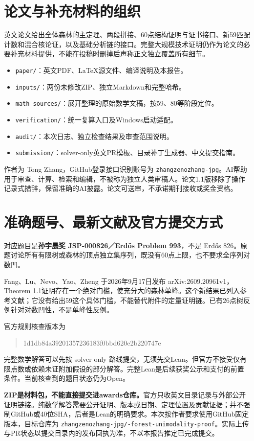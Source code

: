 \documentclass[UTF8,10pt,a4paper]{ctexart}
\begin{document}
\section{论文与补充材料的组织}
英文论文给出全体森林的主定理、两段拼接、60点结构证明与证书接口、新59匹配计数和混合核论证，以及基础分析链的接口。完整大规模技术证明仍作为论文的必要补充材料提供，不能在投稿时删掉后声称正文独立覆盖所有细节。

\begin{itemize}
\item \texttt{paper/}：英文PDF、LaTeX源文件、编译说明及本报告。
\item \texttt{inputs/}：两份未修改ZIP、独立Markdown和完整哈希。
\item \texttt{math-sources/}：展开整理的原始数学文稿，按59、80等阶段定位。
\item \texttt{verification/}：统一复算入口及Windows启动适配。
\item \texttt{audit/}：本次日志、独立检查结果及审查范围说明。
\item \texttt{submission/}：solver-only英文PR模板、目录补丁生成器、中文提交指南。
\end{itemize}
作者为 Tong Zhang，GitHub登录接口识别账号为 \texttt{zhangzenozhang-jpg}。AI帮助用于审查、计算、检索和编辑，不被称为独立人类审稿人。论文1.1版移除了操作记录式措辞，保留准确的AI披露。论文可送审，不承诺期刊接收或奖金资格。

\section{准确题号、最新文献及官方提交方式}
对应题目是\textbf{孙宇晨奖 JSP-000826／Erd\H{o}s Problem 993}，不是 Erd\H{o}s 826。原题讨论所有有限树或森林的顶点独立集序列，既没有60点上限，也不要求全序列对数凹。

Fang、Lu、Nevo、Yao、Zheng 于2026年9月17日发布 arXiv:2609.20961v1，Theorem 1.1证明存在一个绝对门槛，使充分大的森林单峰。这个新结果已列入参考文献；它没有给出59这个具体门槛，不能替代附件的定量证明链。已有26点树反例针对对数凹性，不是单峰性反例。

官方规则核查版本为
\begin{quote}\small\ttfamily
1d1db84a39201357236183f0bbd620e2b220747e
\end{quote}
完整数学解答可以先按 solver-only 路线提交，无须先交Lean。但官方不接受仅有限点数或依赖未证附加假设的部分解答。完整Lean是后续获奖公示和支付的前置条件。当前核查到的题目状态仍为Open。

\textbf{ZIP是材料包，不能直接提交进awards仓库。}官方只收英文目录记录与外部公开证明链接。纯数学解答需要公开证明、版本或日期、定理位置及贡献证据；并不强制GitHub或40位SHA，后者是Lean的明确要求。本次按作者要求使用GitHub固定版本，目标仓库为 \nolinkurl{zhangzenozhang-jpg/-forest-unimodality-proof}。实际上传与PR状态以提交目录内的发布回执为准，不以本报告推定已完成提交。
\end{document}

